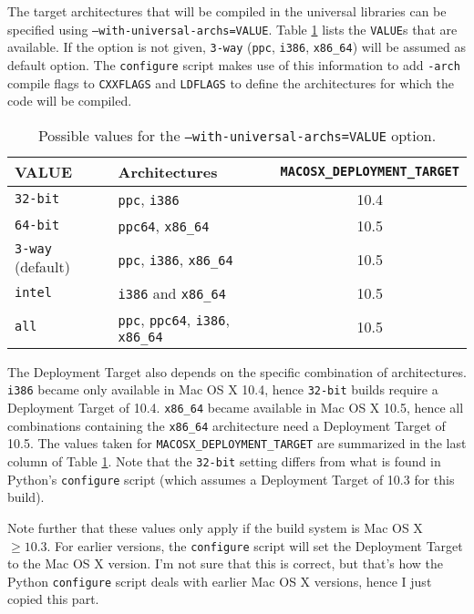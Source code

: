 \documentclass{article}[12pt,a4]
\begin{document}
The target architectures that will be compiled in the universal libraries can be specified using\break
{\tt --with-universal-archs=VALUE}.
Table \ref{table:options} lists the {\tt VALUE}s that are available.
If  the option is not given, {\tt 3-way} ({\tt ppc}, {\tt i386}, {\tt x86\_64})
will be assumed as default option.
The {\tt configure} script makes use of this information to add {\tt -arch} compile flags
to {\tt CXXFLAGS} and {\tt LDFLAGS} to define the architectures for which the code will be 
compiled.

\begin{table}[!h]
  \center
  \begin{tabular}{llc}
  \hline
  VALUE & Architectures & {\tt MACOSX\_DEPLOYMENT\_TARGET} \\
  \hline
  {\tt 32-bit} & {\tt ppc}, {\tt i386} & 10.4 \\
  {\tt 64-bit} & {\tt ppc64}, {\tt x86\_64} & 10.5 \\
  {\tt 3-way} (default) & {\tt ppc}, {\tt i386}, {\tt x86\_64} & 10.5 \\
  {\tt intel} & {\tt i386} and {\tt x86\_64} & 10.5 \\
  {\tt all} & {\tt ppc}, {\tt ppc64}, {\tt i386}, {\tt x86\_64} & 10.5 \\
  \hline
  \end{tabular}
  \caption{Possible values for the {\tt --with-universal-archs=VALUE} option.}
  \label{table:options}
\end{table}

The Deployment Target also depends on the specific combination of architectures.
{\tt i386} became only available in Mac OS X 10.4, hence {\tt 32-bit} builds require
a Deployment Target of 10.4.
{\tt x86\_64} became available in Mac OS X 10.5, hence all combinations containing
the {\tt x86\_64} architecture need a Deployment Target of 10.5.
The values taken for {\tt MACOSX\_DEPLOYMENT\_TARGET} are summarized in the 
last column of Table \ref{table:options}.
Note that the {\tt 32-bit} setting differs from what is found in Python's {\tt configure} script
(which assumes a Deployment Target of 10.3 for this build).

Note further that these values only apply if the build system is Mac OS X $\ge10.3$.
For earlier versions, the {\tt configure} script will set the Deployment Target to the Mac OS X
version.
I'm not sure that this is correct, but that's how the Python {\tt configure} script deals with earlier
Mac OS X versions, hence I just copied this part.
\end{document}
